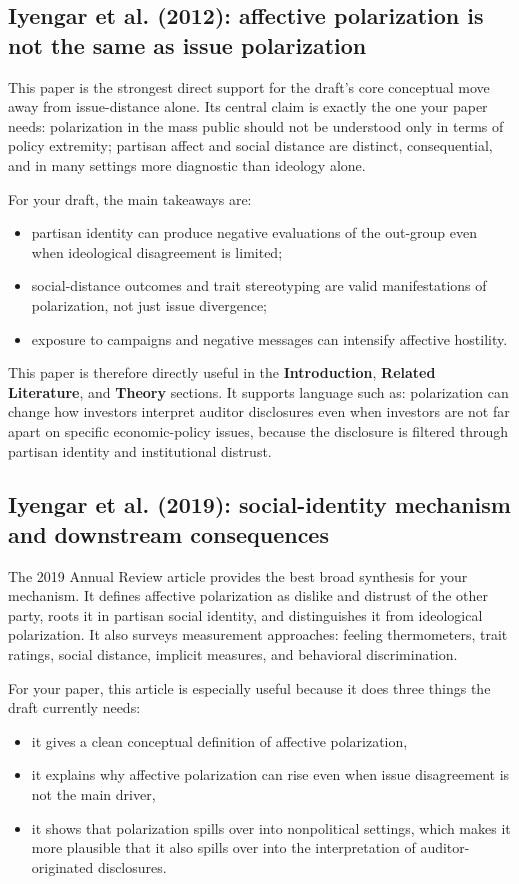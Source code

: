 \documentclass[12pt]{article}
\begin{document}
\subsection{Iyengar et al. (2012): affective polarization is not the same as issue polarization}

This paper is the strongest direct support for the draft's core conceptual move away from issue-distance alone. Its central claim is exactly the one your paper needs: polarization in the mass public should not be understood only in terms of policy extremity; partisan affect and social distance are distinct, consequential, and in many settings more diagnostic than ideology alone.

For your draft, the main takeaways are:
\begin{itemize}
    \item partisan identity can produce negative evaluations of the out-group even when ideological disagreement is limited;
    \item social-distance outcomes and trait stereotyping are valid manifestations of polarization, not just issue divergence;
    \item exposure to campaigns and negative messages can intensify affective hostility.
\end{itemize}

This paper is therefore directly useful in the \textbf{Introduction}, \textbf{Related Literature}, and \textbf{Theory} sections. It supports language such as: polarization can change how investors interpret auditor disclosures even when investors are not far apart on specific economic-policy issues, because the disclosure is filtered through partisan identity and institutional distrust.

\subsection{Iyengar et al. (2019): social-identity mechanism and downstream consequences}

The 2019 Annual Review article provides the best broad synthesis for your mechanism. It defines affective polarization as dislike and distrust of the other party, roots it in partisan social identity, and distinguishes it from ideological polarization. It also surveys measurement approaches: feeling thermometers, trait ratings, social distance, implicit measures, and behavioral discrimination.

For your paper, this article is especially useful because it does three things the draft currently needs:
\begin{itemize}
    \item it gives a clean conceptual definition of affective polarization,
    \item it explains why affective polarization can rise even when issue disagreement is not the main driver,
    \item it shows that polarization spills over into nonpolitical settings, which makes it more plausible that it also spills over into the interpretation of auditor-originated disclosures.
\end{itemize}
\end{document}
